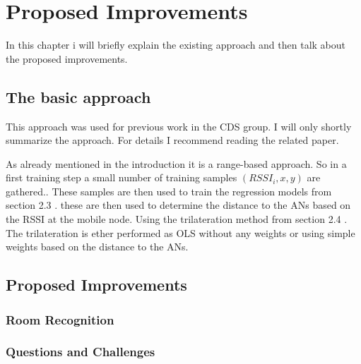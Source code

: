 \chapter{Proposed Improvements} %

\label{Chapter3} %

In this chapter i will briefly explain the existing approach and then talk about the proposed improvements.

\section{The basic approach}

This approach was used for previous work in the CDS group. I will only shortly summarize the approach. For details I recommend reading the related paper.

As already mentioned in the introduction it is a range-based approach. So in a first training step a small number of training samples \((RSSI_{i}, x,y)\) are gathered.. These samples are then used to train the regression models from section 2.3 .  these are then used to determine the distance to the ANs based on the RSSI at the mobile node. Using the trilateration method from section 2.4 . The trilateration is ether performed as OLS without any weights or using simple weights based on the distance to the ANs.

\section{Proposed Improvements}
\subsection{Room Recognition}
\subsection{Questions and Challenges}